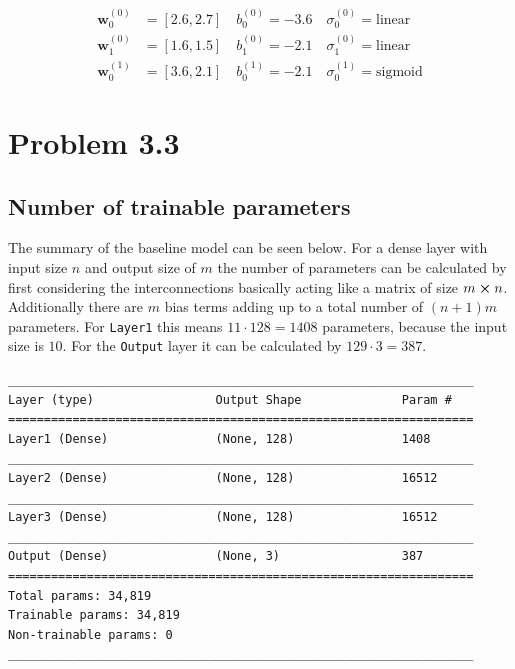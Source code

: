 \documentclass[12pt,a4paper]{scrartcl}
\newcommand{\matr}[1]{\mathbf{#1}}
\begin{document}
	\begin{align}
		\matr{w}_0^{(0)} &= [\num{2.6}, \num{2.7}] \quad b_0^{(0)}=\num{-3.6} \quad \sigma_0^{(0)} = \mathrm{linear} \label{eq:ex3_2_and1}\\
		\matr{w}_1^{(0)} &= [\num{1.6}, \num{1.5}]  \quad b_1^{(0)}=\num{-2.1} \quad \sigma_1^{(0)} = \mathrm{linear} \\
		\matr{w}_0^{(1)} &= [\num{3.6}, \num{2.1}]  \quad b_0^{(1)}=\num{-2.1} \quad \sigma_0^{(1)} = \mathrm{sigmoid} \label{eq:ex3_2_and2}
	\end{align}
	
	\section*{Problem 3.3}
	
	\subsection*{Number of trainable parameters}
	
	The summary of the baseline model can be seen below. For a dense layer with input size $n$ and output size of $m$ the number of parameters can be calculated by first considering the interconnections basically acting like a matrix of size $m\cross n$. Additionally there are $m$ bias terms adding up to a total number of $(n+1)m$ parameters.
	For \texttt{Layer1} this means $11\cdot128 = 1408$ parameters, because the input size is $10$.  For the \texttt{Output} layer it can be calculated by $129\cdot3 = 387$.
	
	\begin{lstlisting}[caption=Summary of baseline model]
_________________________________________________________________
Layer (type)                 Output Shape              Param #   
=================================================================
Layer1 (Dense)               (None, 128)               1408      
_________________________________________________________________
Layer2 (Dense)               (None, 128)               16512     
_________________________________________________________________
Layer3 (Dense)               (None, 128)               16512     
_________________________________________________________________
Output (Dense)               (None, 3)                 387       
=================================================================
Total params: 34,819
Trainable params: 34,819
Non-trainable params: 0
_________________________________________________________________
	\end{lstlisting}
	
\end{document}
